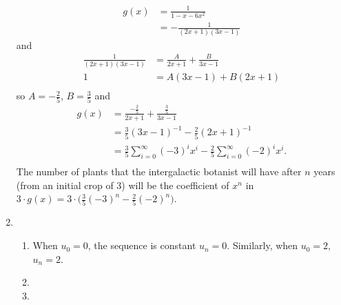 \documentclass[10pt]{article}
\begin{document}
\begin{enumerate}
\begin{align*}
                g(x) &= \frac{1}{1 - x - 6x^2} \\
                     &= -\frac{1}{(2x + 1)(3x  - 1)}
            \end{align*}
            and
            \begin{align*}
                \frac{1}{(2x + 1)(3x  - 1)} &= \frac{A}{2x + 1} + \frac{B}{3x - 1} \\
                                          1 &= A(3x - 1) + B(2x + 1) \\
            \end{align*}
            so $A = -\frac{2}{5}$, $B = \frac{3}{5}$ and
            \begin{align*}
                g(x) &= \frac{-\frac{2}{5}}{2x + 1} + \frac{\frac{3}{5}}{3x - 1} \\
                &= \frac{3}{5}(3x - 1)^{-1}-\frac{2}{5}(2x + 1)^{-1} \\
                &= \frac{3}{5}\sum_{i=0}^\infty (-3)^i x^i-\frac{2}{5}\sum_{i=0}^\infty (-2)^i x^i .\\
            \end{align*}
            The number of plants that the intergalactic botanist will have
            after $n$ years (from an initial crop of 3) will be the coefficient
            of $x^n$ in $3\cdot g(x) = 
                3\cdot \Big(\frac{3}{5}(-3)^n - \frac{2}{5}(-2)^n\Big)$.
        \item
            \begin{enumerate}
                \item When $u_0 = 0$, the sequence is constant $u_n = 0$. Similarly, when $u_0 = 2$, $u_n = 2$.
                \item 
                    \pagebreak
                \item 
                    \pagebreak
            \end{enumerate}
    \end{enumerate}
\end{document}

